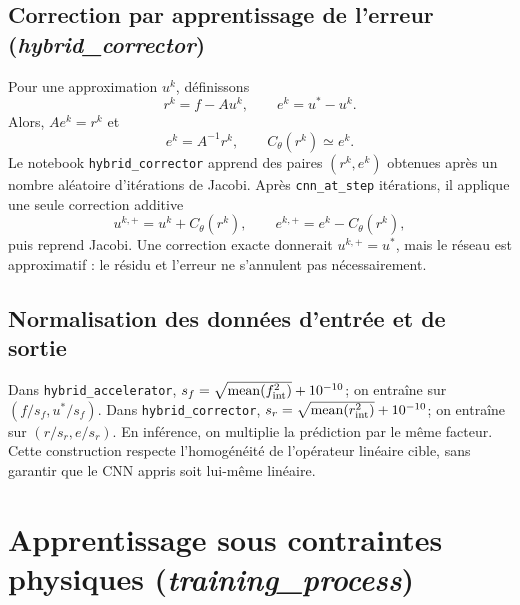 \documentclass[11pt,a4paper]{article}
\begin{document}
\subsection{Correction par apprentissage de l'erreur (\textit{hybrid\_corrector})}

Pour une approximation $u^k$, définissons
\[r^k=f-Au^k,\qquad e^k=u^*-u^k.\]
Alors, $Ae^k=r^k$ et
\[\boxed{e^k=A^{-1}r^k,\qquad C_\theta(r^k)\simeq e^k.}\]
Le notebook \texttt{hybrid\_corrector} apprend des paires $(r^k,e^k)$ obtenues après un nombre aléatoire d'itérations de Jacobi. Après \texttt{cnn\_at\_step} itérations, il applique une seule correction additive
\[u^{k,+}=u^k+C_\theta(r^k),\qquad e^{k,+}=e^k-C_\theta(r^k),\]
puis reprend Jacobi. Une correction exacte donnerait $u^{k,+}=u^*$, mais le réseau est approximatif : le résidu et l'erreur ne s'annulent pas nécessairement.
\begin{center}\end{center}

\subsection{Normalisation des données d'entrée et de sortie}

Dans \texttt{hybrid\_accelerator}, $s_f=\sqrt{\operatorname{mean}(f_{\rm int}^2)}+10^{-10}$; on entraîne sur $(f/s_f,u^*/s_f)$. Dans \texttt{hybrid\_corrector}, $s_r=\sqrt{\operatorname{mean}(r_{\rm int}^2)}+10^{-10}$; on entraîne sur $(r/s_r,e/s_r)$. En inférence, on multiplie la prédiction par le même facteur. Cette construction respecte l'homogénéité de l'opérateur linéaire cible, sans garantir que le CNN appris soit lui-même linéaire.

\section{Apprentissage sous contraintes physiques (\textit{training\_process})}
\end{document}
